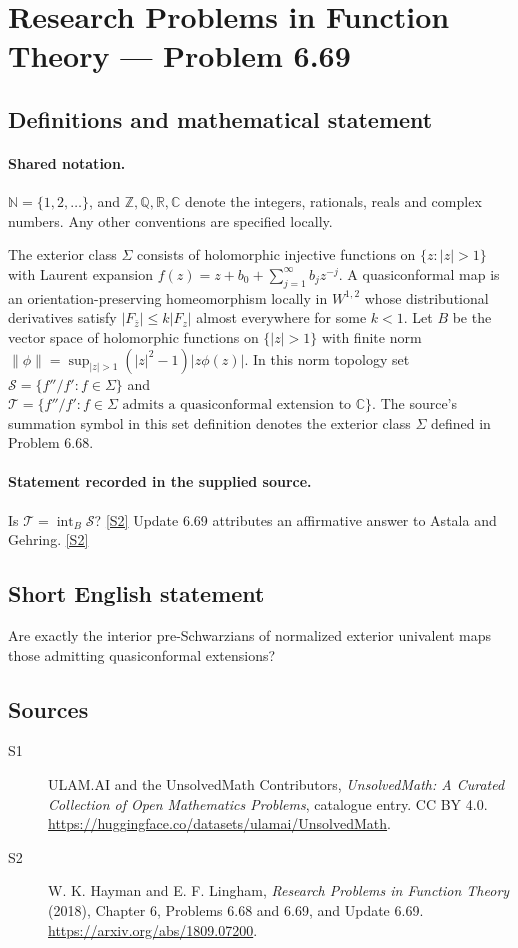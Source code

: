 \documentclass[11pt]{article}
\newcommand{\sref}[2]{\hyperlink{source:#1:#2}{[S#2]}}
\begin{document}
\section{Research Problems in Function Theory — Problem 6.69}\label{statement}

\subsection{Definitions and mathematical statement}

\paragraph{Shared notation.}$\mathbb N=\{1,2,\ldots\}$, and $\mathbb Z,\mathbb Q,\mathbb R,\mathbb C$ denote the integers, rationals, reals and complex numbers. Any other conventions are specified locally.


The exterior class $\Sigma$ consists of holomorphic injective functions on $\{z:|z|>1\}$ with Laurent expansion $f(z)=z+b_0+\sum_{j=1}^{\infty}b_jz^{-j}$. A quasiconformal map is an orientation-preserving homeomorphism locally in $W^{1,2}$ whose distributional derivatives satisfy $|F_{\bar z}|\le k|F_z|$ almost everywhere for some $k<1$. Let $B$ be the vector space of holomorphic functions on $\{|z|>1\}$ with finite norm $\|\phi\|=\sup_{|z|>1}(|z|^2-1)|z\phi(z)|$. In this norm topology set $\mathcal S=\{f''/f':f\in\Sigma\}$ and $\mathcal T=\{f''/f':f\in\Sigma\text{ admits a quasiconformal extension to }\mathbb C\}$. The source's summation symbol in this set definition denotes the exterior class $\Sigma$ defined in Problem 6.68.
\paragraph{Statement recorded in the supplied source.}
Is $\mathcal T=\operatorname{int}_B\mathcal S$? \sref{statement}{2}
Update 6.69 attributes an affirmative answer to Astala and Gehring. \sref{statement}{2}
\subsection{Short English statement}
Are exactly the interior pre-Schwarzians of normalized exterior univalent maps those admitting quasiconformal extensions?
\subsection{Sources}
\begin{description}
\item[\hypertarget{source:statement:1}{S1}] ULAM.AI and the UnsolvedMath Contributors, \emph{UnsolvedMath: A Curated Collection of Open Mathematics Problems}, catalogue entry. CC BY 4.0. \url{https://huggingface.co/datasets/ulamai/UnsolvedMath}.
\item[\hypertarget{source:statement:2}{S2}] W. K. Hayman and E. F. Lingham, \emph{Research Problems in Function Theory} (2018), Chapter 6, Problems 6.68 and 6.69, and Update 6.69. \url{https://arxiv.org/abs/1809.07200}.
\end{description}
\label{end:statement}
\end{document}
